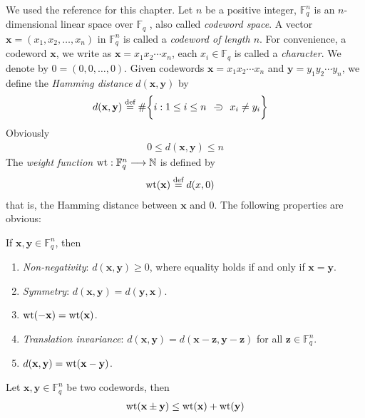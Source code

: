 \documentclass[a4paper, 12pt]{book} %
\begin{document}
We used the reference \cite{zheng2022modern} for this chapter. Let $n$ be a positive integer, $\mathbb{F}_q^n$ is an $n$-dimensional linear space over $\mathbb{F}_q$ , also called \emph{codeword space}. A vector $\mathbf{x} = (x_1, x_2, \ldots , x_n)$ in $\mathbb{F}_q^n$ is called a \emph{codeword of length $n$}. For convenience, a codeword $\mathbf{x}$, we write as $\mathbf{x} = x_1x_2\cdots x_n$, each $x_i \in \mathbb{F}_q$ is called a \emph{character}. We denote by $0 = (0,0, \ldots, 0)$.
Given codewords $\mathbf{x} = x_1 x_2 \cdots x_n$ and $\mathbf{y} = y_1 y_2 \cdots y_n$, we define the \emph{Hamming distance} $d(\mathbf{x}, \mathbf{y})$ by 
\begin{align}
    d(\mathbf{x}, \mathbf{y}) &\overset{\text{def}}{=} \# \bigg\{ i: 1 \leq i \leq n~\hspace{2mm}{\supset}\kern-1em{-} \hspace{2mm}~x_i \neq y_i\bigg\}
\end{align}
Obviously
\begin{align}
    0 \leq d(\mathbf{x}, \mathbf{y}) \leq n
\end{align}
The \emph{weight function} $\mathrm{wt}: \mathbb{F}_q^n \longrightarrow \mathbb{N}$ is defined by 
\begin{align}
    \mathrm{wt}(\mathbf{x}) &\overset{\text{def}}{=} d(x, 0)
\end{align}
that is, the Hamming distance between $\mathbf{x}$ and $0$. The following properties are obvious:

\begin{proposition}
    If $\mathbf{x}, \mathbf{y} \in \mathbb{F}_q^n$, then 
    \begin{enumerate}
        \item \emph{Non-negativity}: $d(\mathbf{x}, \mathbf{y}) \geq 0$, where equality holds if and only if $\mathbf{x} = \mathbf{y}$.
        \item \emph{Symmetry}: $d(\mathbf{x}, \mathbf{y}) = d(\mathbf{y}, \mathbf{x})$.
        \item $\mathrm{wt}(-\mathbf{x}) = \mathrm{wt}(\mathbf{x})$.
        \item \emph{Translation invariance}: $d(\mathbf{x}, \mathbf{y}) = d(\mathbf{x} - \mathbf{z}, \mathbf{y} - \mathbf{z})$ for all $\mathbf{z} \in \mathbb{F}_q^n$.
        \item $d(\mathbf{x}, \mathbf{y}) = \mathrm{wt}(\mathbf{x} - \mathbf{y})$.
    \end{enumerate}
\end{proposition}

\begin{proposition}
    Let $\mathbf{x}, \mathbf{y} \in \mathbb{F}_q^n$ be two codewords, then
    \begin{align}
        \mathrm{wt}(\mathbf{x} \pm \mathbf{y}) \leq \mathrm{wt}(\mathbf{x}) + \mathrm{wt}(\mathbf{y})
    \end{align}
\end{proposition}
\end{document}
